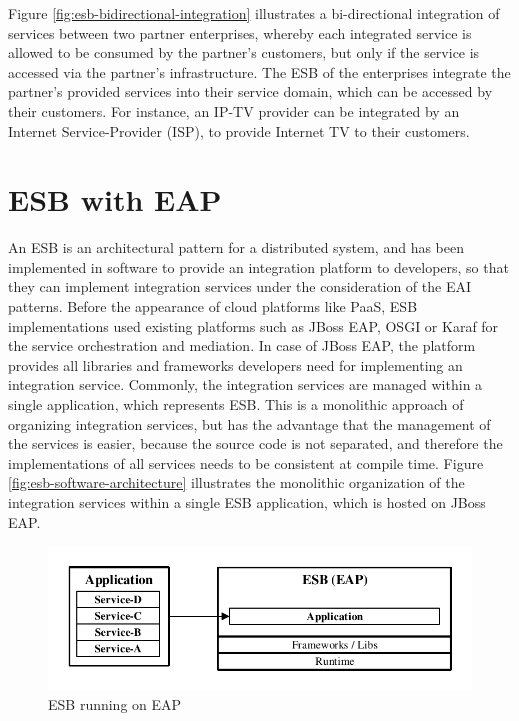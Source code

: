 Figure \vref{fig:esb-bidirectional-integration} illustrates a bi-directional integration of services between two partner enterprises, whereby each integrated service is allowed to be consumed by the partner's customers, but only if the service is accessed via the partner's infrastructure. The ESB of the enterprises integrate the partner's provided services into their service domain, which can be accessed by their customers. For instance, an IP-TV provider can be integrated by an Internet Service-Provider (ISP), to provide Internet TV to their customers. 

\section{ESB with EAP}
\label{sec:esb-as-software}
An ESB is an architectural pattern for a distributed system, and has been implemented in software to provide an integration platform to developers, so that they can implement integration services under the consideration of the EAI patterns. Before the appearance of cloud platforms like PaaS, ESB implementations used existing platforms such as JBoss EAP, OSGI or Karaf for the service orchestration and mediation. In case of JBoss EAP, the platform provides all libraries and frameworks developers need for implementing an integration service. Commonly, the integration services are managed within a single application, which represents ESB. This is a monolithic approach of organizing integration services, but has the advantage that the management of the services is easier, because the source code is not separated, and therefore the implementations of all services needs to be consistent at compile time. Figure \vref{fig:esb-software-architecture} illustrates the monolithic organization of the integration services within a single ESB application, which is hosted on JBoss EAP.

\begin{figure}[htbp]
	\centering
	\includegraphics[scale=1]{images/esb-software-architecture.pdf}
	\caption{ESB running on EAP}
	\label{fig:esb-software-architecture}
\end{figure} 

